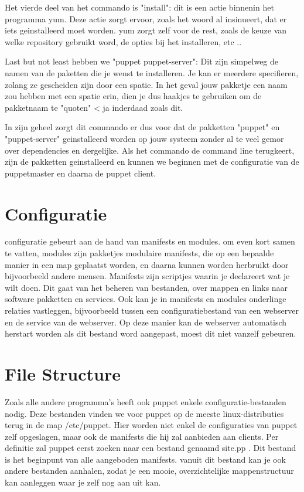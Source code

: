 Het vierde deel van het commando is "install": dit is een actie binnenin het programma yum. Deze actie zorgt ervoor, zoals het woord al insinueert, dat er iets geinstalleerd moet worden. yum zorgt zelf voor de rest, zoals de keuze van welke repository gebruikt word, de opties bij het installeren, etc ..

Last but not least hebben we "puppet puppet-server": Dit zijn simpelweg de namen van de paketten die je wenst te installeren. Je kan er meerdere specifieren, zolang ze gescheiden zijn door een spatie. In het geval jouw pakketje een naam zou hebben met een spatie erin, dien je dus haakjes te gebruiken om de pakketnaam te "quoten" < ja inderdaad zoals dit.

In zijn geheel zorgt dit commando er dus voor dat de pakketten "puppet" en "puppet-server" geinstalleerd worden op jouw systeem zonder al te veel gemor over dependencies en dergelijke. Als het commando de command line terugkeert, zijn de pakketten geinstalleerd en kunnen we beginnen met de configuratie van de puppetmaster en daarna de puppet client.


\section{Configuratie}
configuratie gebeurt aan de hand van manifests en modules. om even kort samen te vatten, modules zijn pakketjes modulaire manifests, die op een bepaalde manier in een map geplaatst worden, en daarna kunnen worden herbruikt door bijvoorbeeld andere mensen. Manifests zijn scriptjes waarin je declareert wat je wilt doen. Dit gaat van het beheren van bestanden, over mappen en links naar software pakketten en services.
Ook kan je in manifests en modules onderlinge relaties vastleggen, bijvoorbeeld tussen een configuratiebestand van een webserver en de service van de webserver. Op deze manier kan de webserver automatisch herstart worden als dit bestand word aangepast, moest dit niet vanzelf gebeuren.


\section{File Structure}
Zoals alle andere programma's heeft ook puppet enkele configuratie-bestanden nodig. Deze bestanden vinden we voor puppet op de meeste linux-distributies terug in de map /etc/puppet. Hier worden niet enkel de configuraties van puppet zelf opgeslagen, maar ook de manifests die hij zal aanbieden aan clients. Per definitie zal puppet eerst zoeken naar een bestand genaamd site.pp . Dit bestand is het beginpunt van alle aangeboden manifests. vanuit dit bestand kan je ook andere bestanden aanhalen, zodat je een mooie, overzichtelijke mappenstructuur kan aanleggen waar je zelf nog aan uit kan.


